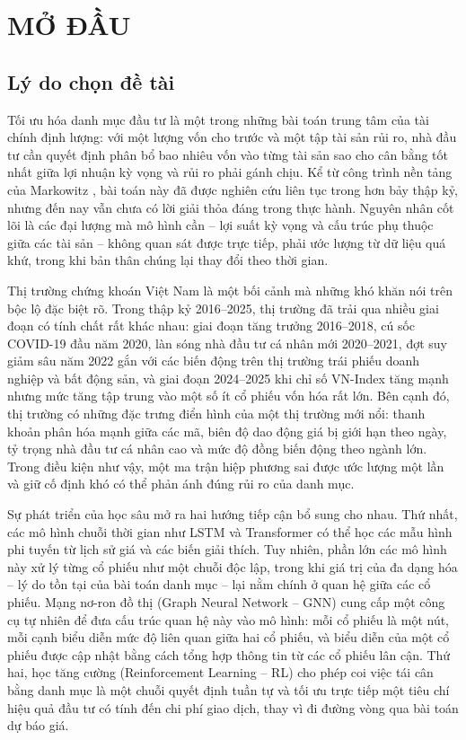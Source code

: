 \chapter*{MỞ ĐẦU}

\section*{Lý do chọn đề tài}

Tối ưu hóa danh mục đầu tư là một trong những bài toán trung tâm của tài chính định lượng: với một lượng vốn cho trước và một tập tài sản rủi ro, nhà đầu tư cần quyết định phân bổ bao nhiêu vốn vào từng tài sản sao cho cân bằng tốt nhất giữa lợi nhuận kỳ vọng và rủi ro phải gánh chịu. Kể từ công trình nền tảng của Markowitz \cite{markowitz1952}, bài toán này đã được nghiên cứu liên tục trong hơn bảy thập kỷ, nhưng đến nay vẫn chưa có lời giải thỏa đáng trong thực hành. Nguyên nhân cốt lõi là các đại lượng mà mô hình cần -- lợi suất kỳ vọng và cấu trúc phụ thuộc giữa các tài sản -- không quan sát được trực tiếp, phải ước lượng từ dữ liệu quá khứ, trong khi bản thân chúng lại thay đổi theo thời gian.

Thị trường chứng khoán Việt Nam là một bối cảnh mà những khó khăn nói trên bộc lộ đặc biệt rõ. Trong thập kỷ 2016--2025, thị trường đã trải qua nhiều giai đoạn có tính chất rất khác nhau: giai đoạn tăng trưởng 2016--2018, cú sốc COVID-19 đầu năm 2020, làn sóng nhà đầu tư cá nhân mới 2020--2021, đợt suy giảm sâu năm 2022 gắn với các biến động trên thị trường trái phiếu doanh nghiệp và bất động sản, và giai đoạn 2024--2025 khi chỉ số VN-Index tăng mạnh nhưng mức tăng tập trung vào một số ít cổ phiếu vốn hóa rất lớn. Bên cạnh đó, thị trường có những đặc trưng điển hình của một thị trường mới nổi: thanh khoản phân hóa mạnh giữa các mã, biên độ dao động giá bị giới hạn theo ngày, tỷ trọng nhà đầu tư cá nhân cao và mức độ đồng biến động theo ngành lớn. Trong điều kiện như vậy, một ma trận hiệp phương sai được ước lượng một lần và giữ cố định khó có thể phản ánh đúng rủi ro của danh mục.

Sự phát triển của học sâu mở ra hai hướng tiếp cận bổ sung cho nhau. Thứ nhất, các mô hình chuỗi thời gian như LSTM \cite{hochreiter1997} và Transformer \cite{vaswani2017} có thể học các mẫu hình phi tuyến từ lịch sử giá và các biến giải thích. Tuy nhiên, phần lớn các mô hình này xử lý từng cổ phiếu như một chuỗi độc lập, trong khi giá trị của đa dạng hóa -- lý do tồn tại của bài toán danh mục -- lại nằm chính ở quan hệ giữa các cổ phiếu. Mạng nơ-ron đồ thị (Graph Neural Network -- GNN) \cite{kipf2017,velickovic2018} cung cấp một công cụ tự nhiên để đưa cấu trúc quan hệ này vào mô hình: mỗi cổ phiếu là một nút, mỗi cạnh biểu diễn mức độ liên quan giữa hai cổ phiếu, và biểu diễn của một cổ phiếu được cập nhật bằng cách tổng hợp thông tin từ các cổ phiếu lân cận. Thứ hai, học tăng cường (Reinforcement Learning -- RL) \cite{sutton2018} cho phép coi việc tái cân bằng danh mục là một chuỗi quyết định tuần tự và tối ưu trực tiếp một tiêu chí hiệu quả đầu tư có tính đến chi phí giao dịch, thay vì đi đường vòng qua bài toán dự báo giá.

